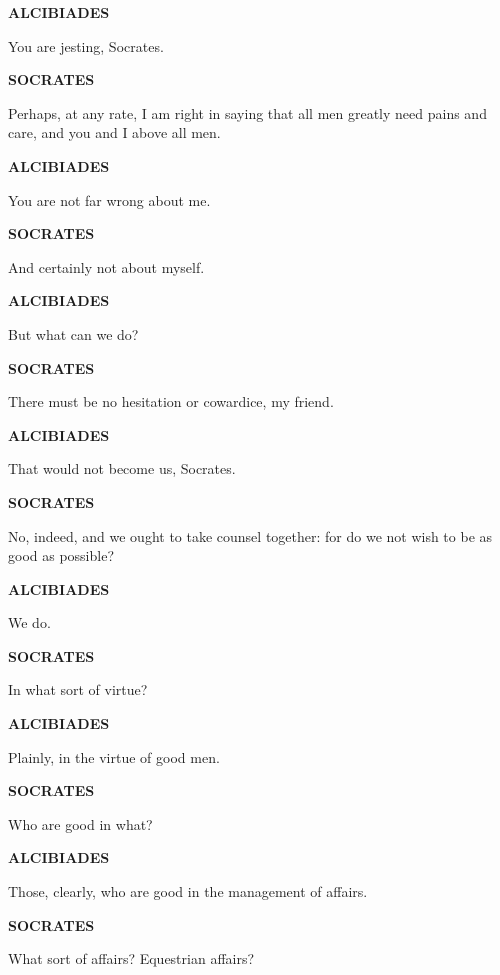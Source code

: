 \documentclass[11pt,letter]{article}
\begin{document}
\par \textbf{ALCIBIADES}
\par   You are jesting, Socrates.

\par \textbf{SOCRATES}
\par   Perhaps, at any rate, I am right in saying that all men greatly need pains and care, and you and I above all men.

\par \textbf{ALCIBIADES}
\par   You are not far wrong about me.

\par \textbf{SOCRATES}
\par   And certainly not about myself.

\par \textbf{ALCIBIADES}
\par   But what can we do?

\par \textbf{SOCRATES}
\par   There must be no hesitation or cowardice, my friend.

\par \textbf{ALCIBIADES}
\par   That would not become us, Socrates.

\par \textbf{SOCRATES}
\par   No, indeed, and we ought to take counsel together:  for do we not wish to be as good as possible?

\par \textbf{ALCIBIADES}
\par   We do.

\par \textbf{SOCRATES}
\par   In what sort of virtue?

\par \textbf{ALCIBIADES}
\par   Plainly, in the virtue of good men.

\par \textbf{SOCRATES}
\par   Who are good in what?

\par \textbf{ALCIBIADES}
\par   Those, clearly, who are good in the management of affairs.

\par \textbf{SOCRATES}
\par   What sort of affairs? Equestrian affairs?
\end{document}
